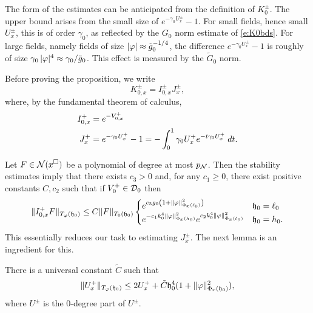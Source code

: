The form of the estimates  can be anticipated from the definition of
$K_0^\pm$.
The upper bound arises from the small size of
$e^{-\gamma_0U_x^\pm}-1$.  For small fields, hence small $U_x^\pm$, this is of order $\gamma_0$,
as reflected by the $G_0$ norm estimate of \eqref{e:K0bds}.
For large fields, namely fields of size $|\varphi| \approx \tilde{g}_{0}^{-1/4}$, the difference
$e^{-\gamma_0U_x^\pm}-1$ is roughly of size $\gamma_0\,|\varphi|^4 \approx \gamma_0/\tilde{g}_0$.
This effect is measured by the $\tilde G_0$ norm.

Before proving the proposition, we write
\begin{equation}
K^\pm_{0,x} = I^\pm_{0,x} J^\pm_x
  \label{e:KIJ},
\end{equation}
where, by the fundamental theorem of calculus,
\begin{align}
    I^+_{0,x} &= e^{-V^+_{0,x}} \\
    J^+_x
    &= e^{-\gamma_0U^+_x} - 1
    = - \int_0^{1} \gamma_0 U^+_x e^{-t \gamma_0 U^+_x} \; dt.
\label{e:J}
\end{align}

Let $F \in \mathcal{N}(x^\square)$ be a polynomial of degree at most $p_{\mathcal{N}}$.
Then the stability estimates \cite[\eqref{IE-e:Iupper-a}--\eqref{IE-e:Iupper-b}]{BS-rg-IE}
imply that there exists $c_3 > 0$ and, for any $c_1 \geq 0$,
there exist positive constants $C, c_2$ such that
if $V_0^+ \in \mathcal{D}_0$ then
\begin{equation}
\label{e:Iupper}
\|I^+_{0,x} F\|_{T_\varphi(\mathfrak{h}_0)}
  \leq
C \|F\|_{T_0(\mathfrak{h}_0)}
\begin{cases}
  e^{c_3 g_0 \left(1 + \|\varphi\|^2_{\Phi_x(\ell_0)}\right)}
    & \mathfrak{h}_0 = \ell_0 \\
  e^{-c_1 k_0^4 \|\varphi\|^2_{\Phi_x(h_0)}} e^{c_2 k_0^4 \|\varphi\|^2_{\tilde\Phi_x(\ell_0)}}
    & \mathfrak{h}_0 = h_0.
\end{cases}
\end{equation}
This essentially reduces our task to estimating $J^\pm_x$.
The next lemma is an ingredient for this.

\begin{lemma}
\label{lem:FFnull-loc}
There is a universal constant $\tilde C$ such that
\begin{equation}
\label{e:FFnull}
\|U^+_x\|_{T_\varphi(\mathfrak{h}_0)}
  \leq
2 U^+_x + \tilde C \mathfrak{h}_0^4 (1 + \|\varphi\|^2_{\Phi_x(\mathfrak{h}_0)}),
\end{equation}
where $U^\pm$ is the 0-degree part of $U^\pm$.
\end{lemma}

